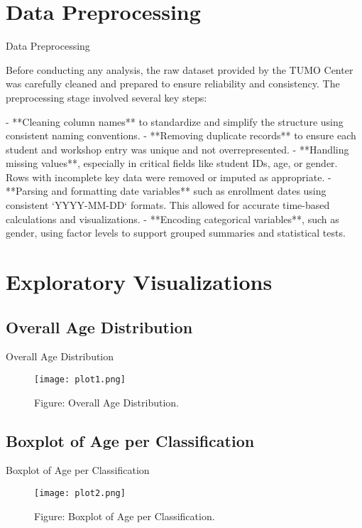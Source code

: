\documentclass[11pt]{beamer}
\begin{document}
\section{Data Preprocessing}
\begin{frame}{Data Preprocessing}
  \begin{itemize}
    Before conducting any analysis, the raw dataset provided by the TUMO Center was carefully cleaned and prepared to ensure reliability and consistency. The preprocessing stage involved several key steps:

- **Cleaning column names** to standardize and simplify the structure using consistent naming conventions.  
- **Removing duplicate records** to ensure each student and workshop entry was unique and not overrepresented.  
- **Handling missing values**, especially in critical fields like student IDs, age, or gender. Rows with incomplete key data were removed or imputed as appropriate.  
- **Parsing and formatting date variables** such as enrollment dates using consistent `YYYY-MM-DD` formats. This allowed for accurate time-based calculations and visualizations.  
- **Encoding categorical variables**, such as gender, using factor levels to support grouped summaries and statistical tests.  
  \end{itemize}
\end{frame}

\section{Exploratory Visualizations}

\subsection{Overall Age Distribution}
\begin{frame}{Overall Age Distribution}
  \begin{figure}
    \centering
    \texttt{[image: plot1.png]}
    \caption{Figure: Overall Age Distribution.}
  \end{figure}
\end{frame}

\subsection{Boxplot of Age per Classification}
\begin{frame}{Boxplot of Age per Classification}
    \begin{figure}
    \centering
    \texttt{[image: plot2.png]}
    \caption{Figure: Boxplot of Age per Classification.}
    \end{figure}
\end{frame}
\end{document}
